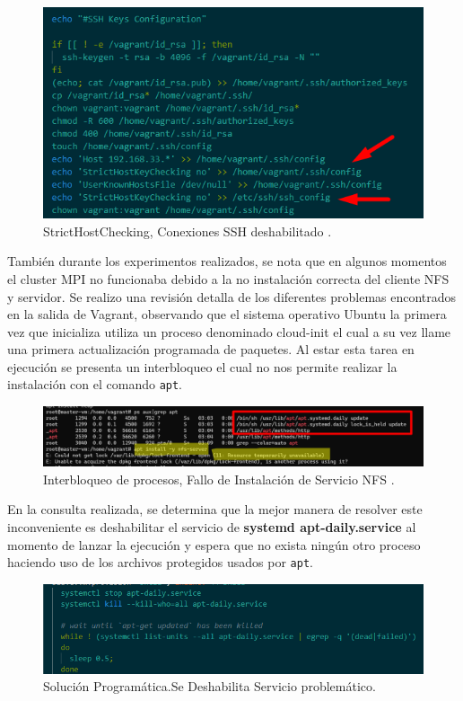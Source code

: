 \documentclass[letterpaper, 12pt, oneside]{article}
\begin{document}
    \begin{figure}[H]\centering
            \includegraphics[scale=1.4]{img/provision/checkeodessh.png}
            \caption{StrictHostChecking, Conexiones SSH deshabilitado .}
            \label{fig:checkssh}
    \end{figure}
    También durante los experimentos realizados, se nota que en algunos momentos el cluster MPI no funcionaba debido a la no instalación correcta del cliente NFS y servidor. Se realizo una revisión detalla de los diferentes problemas encontrados en la salida de Vagrant, observando que el sistema operativo Ubuntu la primera vez que inicializa utiliza un proceso denominado cloud-init el cual a su vez llame una primera actualización programada de paquetes. Al estar esta tarea en ejecución se presenta un interbloqueo el cual no nos permite realizar la instalación con el comando \texttt{apt}. 
    \begin{figure}[H]\centering
            \includegraphics[scale=1.2]{img/provision/problemaapt.png}
            \caption{Interbloqueo de procesos, Fallo de Instalación de Servicio NFS .}
            \label{fig:checkssh}
    \end{figure}
    En la consulta realizada, se determina que la mejor manera de resolver este inconveniente es deshabilitar el servicio de \textbf{systemd apt-daily.service} al momento de lanzar la ejecución y espera que no exista ningún otro proceso haciendo uso de los archivos protegidos usados por \texttt{apt}.
    \begin{figure}[H]\centering
            \includegraphics[scale=1.4]{img/provision/problemaapt1.png}
            \caption{Solución Programática.Se Deshabilita Servicio problemático.}
            \label{fig:checkssh}
    \end{figure}
    
\end{document}
